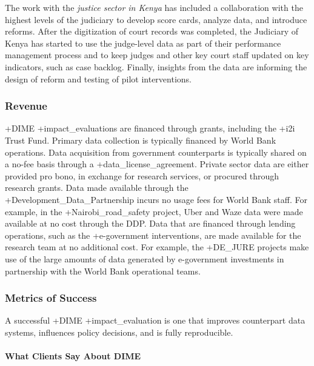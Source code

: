 \documentclass[
]{WileySix}
\begin{document}
The work with the \emph{justice sector in Kenya} has included a collaboration with the highest levels of the judiciary to develop score cards, analyze data, and introduce reforms. After the digitization of court records was completed, the Judiciary of Kenya has started to use the judge-level data as part of their performance management process and to keep judges and other key court staff updated on key indicators, such as case backlog. Finally, insights from the data are informing the design of reform and testing of pilot interventions.

\hypertarget{revenue-6}{%
\subsubsection{Revenue}\label{revenue-6}}

+DIME\textbar{} +impact\_evaluations\textbar{} are financed through grants, including the +i2i\textbar{} Trust Fund. Primary data collection is typically financed by World Bank operations. Data acquisition from government counterparts is typically shared on a no-fee basis through a +data\_license\_agreement\textbar. Private sector data are either provided pro bono, in exchange for research services, or procured through research grants. Data made available through the +Development\_Data\_Partnership\textbar{} incurs no usage fees for World Bank staff. For example, in the +Nairobi\_road\_safety\textbar{} project, Uber and Waze data were made available at no cost through the DDP. Data that are financed through lending operations, such as the +e-government\textbar{} interventions, are made available for the research team at no additional cost. For example, the +DE\_JURE\textbar{} projects make use of the large amounts of data generated by e-government investments in partnership with the World Bank operational teams.

\hypertarget{metrics-of-success-6}{%
\subsubsection{Metrics of Success}\label{metrics-of-success-6}}

A successful +DIME\textbar{} +impact\_evaluation\textbar{} is one that improves counterpart data systems, influences policy decisions, and is fully reproducible.

\hypertarget{what-clients-say-about-dime}{%
\paragraph{What Clients Say About DIME}\label{what-clients-say-about-dime}}
\end{document}
